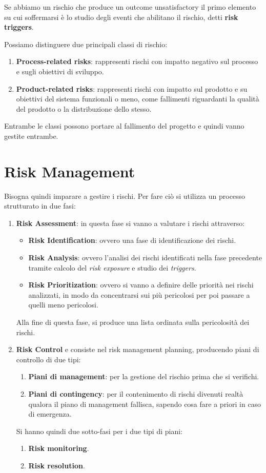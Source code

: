 Se abbiamo un rischio che produce un outcome unsatisfactory il primo elemento su cui soffermarsi è lo studio degli eventi che abilitano il rischio, detti \textbf{risk triggers}.

Possiamo distinguere due principali classi di rischio:
\begin{enumerate}
    \item \textbf{Process-related risks}: rappresenti rischi con impatto negativo sul processo e sugli obiettivi di sviluppo.
    \item \textbf{Product-related risks}: rappresenti rischi con impatto sul prodotto e su obiettivi del sistema funzionali o meno, come fallimenti riguardanti la qualità del prodotto o la distribuzione dello stesso.
\end{enumerate}
Entrambe le classi possono portare al fallimento del progetto e quindi vanno gestite entrambe.
\section{Risk Management}
Bisogna quindi imparare a gestire i rischi. Per fare ciò si utilizza un processo strutturato in due fasi:
\begin{enumerate}
    \item \textbf{Risk Assessment}: in questa fase si vanno a valutare i rischi attraverso:
    \begin{itemize}
        \item \textbf{Risk Identification}: ovvero una fase di identificazione dei rischi. 
        \item \textbf{Risk Analysis}: ovvero l'analisi dei rischi identificati nella fase precedente tramite calcolo del \textit{risk exposure} e studio dei \textit{triggers}.
        \item \textbf{Risk Prioritization}: ovvero si vanno a definire delle priorità nei rischi analizzati, in modo da concentrarsi sui più pericolosi per poi passare a quelli meno pericolosi.
    \end{itemize}
    
    Alla fine di questa fase, si produce una lista ordinata sulla pericolosità dei rischi. 
    \item \textbf{Risk Control} e consiste nel risk management planning, producendo piani di controllo di due tipi:
    \begin{enumerate}
        \item \textbf{Piani di management}: per la gestione del rischio prima che si verifichi.
        \item \textbf{Piani di contingency}: per il contenimento di rischi divenuti realtà qualora il piano di management fallisca, sapendo cosa fare a priori in caso di emergenza.
    \end{enumerate}
    
    Si hanno quindi due sotto-fasi per i due tipi di piani:
    \begin{enumerate}
        \item \textbf{Risk monitoring}.
        \item \textbf{Risk resolution}.
    \end{enumerate}
\end{enumerate}


